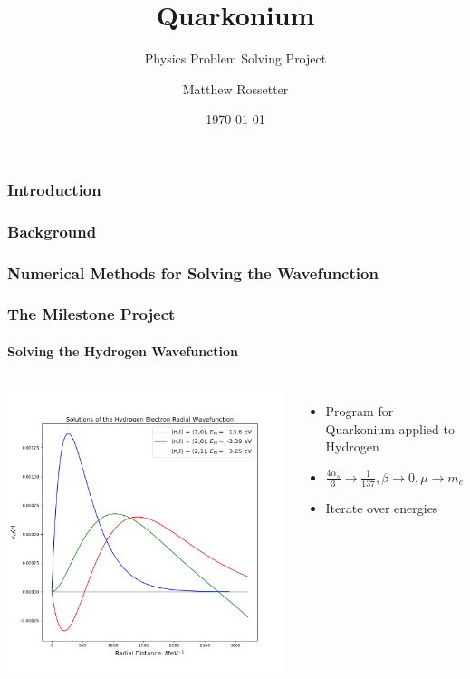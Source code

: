 \documentclass[10pt,usenames,dvipsnames]{beamer}
\title{Quarkonium}
\subtitle{Physics Problem Solving Project}
\author{Matthew Rossetter}
\institute{
    Durham University
}
\date{\today}
\begin{document}
\frame{\titlepage}

\begin{frame}
    \frametitle{Introduction}
\end{frame}

\begin{frame}
    \frametitle{Background}
\end{frame}

\begin{frame}
    \frametitle{Numerical Methods for Solving the Wavefunction}
\end{frame}

\begin{frame}
    \frametitle{The Milestone Project}
    \framesubtitle{Solving the Hydrogen Wavefunction}
    \begin{columns}[c]
        \begin{center}
            \includegraphics[scale=0.2]{images/hydro.png}
        \end{center}
        \begin{itemize}
            \item Program for Quarkonium applied to Hydrogen
            \item $\frac{4\alpha_s}{3} \to \frac{1}{137}, \beta \to 0, \mu \to m_e$
            \item Iterate over energies

\end{itemize}
\end{columns}
\end{frame}
\end{document}
